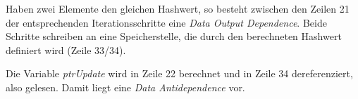 \documentclass[11pt,a4paper]{scrartcl}
\begin{document}
Haben zwei Elemente den gleichen Hashwert, so besteht zwischen den Zeilen 21 der entsprechenden 
Iterationsschritte eine \emph{Data Output Dependence}. Beide Schritte schreiben an eine Speicherstelle, 
die durch den berechneten Hashwert definiert wird (Zeile 33/34). 

Die Variable \emph{ptrUpdate} wird in Zeile 22 berechnet und in Zeile 34 dereferenziert, also gelesen. Damit liegt eine \emph{Data Antidependence} vor. 




%
%
\end{document}
